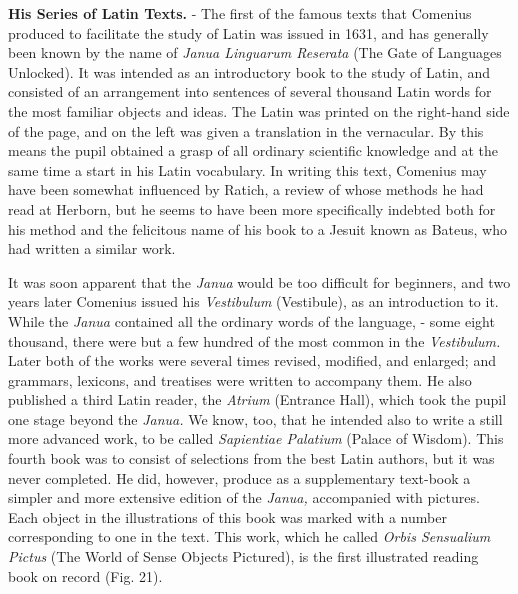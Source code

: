 \documentclass[]{book}
\begin{document}
\textbf{His Series of Latin Texts.} - The first of the famous texts that Comenius produced to facilitate the study of Latin was issued in 1631, and has generally been known by the name of \emph{Janua Linguarum Reserata} (The Gate of Languages Unlocked). It was intended as an introductory book to the study of Latin, and consisted of an arrangement into sentences of several thousand Latin words for the most familiar objects and ideas. The Latin was printed on the right-hand side of the page, and on the left was given a translation in the vernacular. By this means the pupil obtained a grasp of all ordinary scientific knowledge and at the same time a start in his Latin vocabulary. In writing this text, Comenius may have been somewhat influenced by Ratich, a review of whose methods he had read at Herborn, but he seems to have been more specifically indebted both for his method and the felicitous name of his book to a Jesuit known as Bateus, who had written a similar work.

It was soon apparent that the \emph{Janua} would be too difficult for beginners, and two years later Comenius issued his \emph{Vestibulum} (Vestibule), as an introduction to it. While the \emph{Janua} contained all the ordinary words of the language, - some eight thousand, there were but a few hundred of the most common in the \emph{Vestibulum.} Later both of the works were several times revised, modified, and enlarged; and grammars, lexicons, and treatises were written to accompany them. He also published a third Latin reader, the \emph{Atrium} (Entrance Hall), which took the pupil one stage beyond the \emph{Janua.} We know, too, that he intended also to write a still more advanced work, to be called \emph{Sapientiae Palatium} (Palace of Wisdom). This fourth book was to consist of selections from the best Latin authors, but it was never completed. He did, however, produce as a supplementary text-book a simpler and more extensive edition of the \emph{Janua,} accompanied with pictures. Each object in the illustrations of this book was marked with a number corresponding to one in the text. This work, which he called \emph{Orbis Sensualium Pictus} (The World of Sense Objects Pictured), is the first illustrated reading book on record (Fig. 21).
\end{document}
